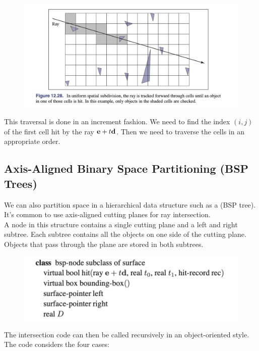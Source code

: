 \documentclass[11pt]{article}
\numberwithin{equation}{section}
\begin{document}
	\begin{figure}[H]
	\centering
	\includegraphics[scale=0.7]{p12}
	\end{figure}

\noindent This traversal is done in an increment fashion. We need to find the index $(i, j)$ of the first cell hit by the ray $\textbf{e} + t\textbf{d}$. Then we need to traverse the cells in an appropriate order. 

\subsection{Axis-Aligned Binary Space Partitioning (BSP Trees)}
We can also partition space in a hierarchical data structure such as a  (BSP tree). It's common to use axis-aligned cutting planes for ray intersection.\\
A node in this structure contains a single cutting plane and a left and right subtree. Each subtree contains all the objects on one side of the cutting plane. Objects that pass through the plane are stored in both subtrees. 
	\begin{figure}[H]
	\centering
	\includegraphics[scale=0.7]{p13}
	\end{figure}
The intersection code can then be called recursively in an object-oriented style. The code considers the four cases:
\end{document}
